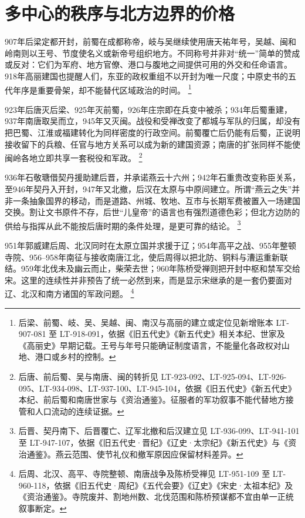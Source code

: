 \section{多中心的秩序与北方边界的价格}
\label{sec:regional-order-northern-price}

907年后梁定都开封，前蜀在成都称帝，岐与吴继续使用唐天祐年号，吴越、闽和岭南则以王号、节度使名义或新帝号组织地方。不同称号并非对“统一”简单的赞成或反对：它们为军府、地方官僚、港口与腹地之间提供可用的外交和任命语言。918年高丽建国也提醒人们，东亚的政权重组不以开封为唯一尺度；中原史书的五代年序是重要骨架，却不能替代区域政治的时间。%
\footnote{后梁、前蜀、岐、吴、吴越、闽、南汉与高丽的建立或定位见新增账本 LT-907-081 至 LT-918-091，依据《旧五代史》《新五代史》相关本纪、世家及《高丽史》早期记载。王号与年号只能确证制度语言，不能量化各政权对山地、港口或乡村的控制。}

923年后唐灭后梁、925年灭前蜀，926年庄宗即在兵变中被杀；934年后蜀重建，937年南唐取吴而立，945年又灭闽。战役和受禅改变了都城与军队的归属，却没有把巴蜀、江淮或福建转化为同样密度的行政空间。前蜀覆亡后仍能有后蜀，正说明接收留下的兵粮、任官与地方关系可以成为新的建国资源；南唐的扩张同样不能使闽岭各地立即共享一套税役和军政。%
\footnote{后唐、前后蜀、吴与南唐、闽的转折见 LT-923-092、LT-925-094、LT-926-095、LT-934-098、LT-937-100、LT-945-104，依据《旧五代史》《新五代史》本纪、前后蜀和南唐世家与《资治通鉴》。征服者的军功叙事不能代替地方接管和人口流动的连续证据。}

936年石敬瑭借契丹援助建后晋，并承诺燕云十六州；942年石重贵改变称臣关系，至946年契丹入开封，947年又北撤，后汉在太原与中原间建立。所谓“燕云之失”并非一条抽象国界的移动，而是道路、州城、牧地、互市与长期军费被置入一场建国交换。割让文书原件不存，后世“儿皇帝”的语言也有强烈道德色彩；但北方边防的供给与指挥从此不能按后唐时期的条件处理，是更可靠的结论。%
\footnote{后晋、契丹南下、后晋覆亡、辽军北撤和后汉建立见 LT-936-099、LT-941-101 至 LT-947-107，依据《旧五代史·晋纪》《辽史·太宗纪》《新五代史》与《资治通鉴》。燕云范围、使节礼仪和撤军原因应保留材料差异。}

951年郭威建后周、北汉同时在太原立国并求援于辽；954年高平之战、955年整顿寺院、956--958年南征与接收南唐江北，使后周得以把北防、铜料与漕运重新联结。959年北伐未及幽云而止，柴荣去世；960年陈桥受禅则把开封中枢和禁军交给宋。这里的连续性并非预告了统一必然到来，而是显示宋继承的是一套仍要面对辽、北汉和南方诸国的军政问题。%
\footnote{后周、北汉、高平、寺院整顿、南唐战争及陈桥受禅见 LT-951-109 至 LT-960-118，依据《旧五代史·周纪》《五代会要》《辽史》《宋史·太祖本纪》及《资治通鉴》。寺院废并、割地州数、北伐范围和陈桥预谋都不宜由单一正统叙事断定。}
